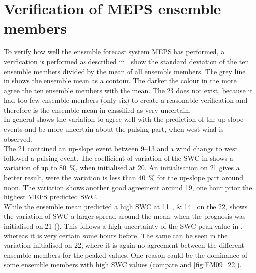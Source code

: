\section{Verification of MEPS ensemble members}\label{sec:variation}

To verify how well the ensemble forecast system MEPS has performed, a verification is performed as described in .  show the standard deviation of the ten ensemble members divided by the mean of all ensemble members. 
The grey line in  shows the ensemble mean as a contour. The darker the colour in  the more agree the ten ensemble members with the mean. The \SI{23}{\dec} does not exist, because it had too few ensemble members (only six) to create a reasonable verification and therefore is the ensemble mean in  classified as very uncertain. 
\\
In general shows the variation to agree well with the prediction of the up-slope events and be more uncertain about the pulsing part, when west wind is observed. 
\\
The \SI{21}{\dec} contained an up-slope event between \SIrange{9}{13}{\UTC} and a wind change to west followed a pulsing event. The coefficient of variation of the SWC in  shows a variation of up to \SI{80}{\percent}, when initialised at \SI{20}{\UTC}. An initialisation on \SI{21}{\dec} gives a better result, were the variation is less than \SI{40}{\percent} for the up-slope part around noon. The variation shows another good agreement around \SI{19}{\UTC}, one hour prior the highest MEPS predicted SWC. 
\\
While the ensemble mean predicted a high SWC at \SIlist{11;14}{\UTC} on the \SI{22}{\dec}, shows the variation of SWC a larger spread around the mean, when the prognosis was initialised on \SI{21}{\dec} (). This follows a high uncertainty of the SWC peak value in , whereas it is very certain some hours before. The same can be seen in the variation initialised on \SI{22}{\dec}, where it is again no agreement between the different ensemble members for the peaked values. One reason could be the dominance of some ensemble members with high SWC values (compare  and \ref{fig:EM09_22}). 
\\
